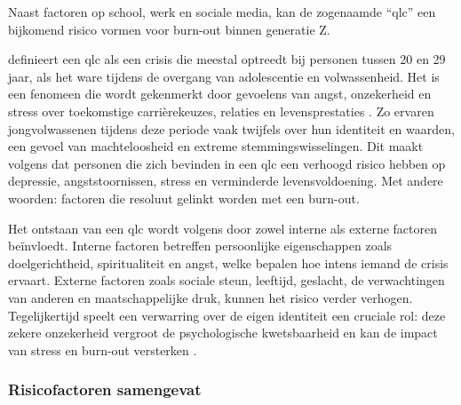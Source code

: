 Naast factoren op school, werk en sociale media, kan de zogenaamde “\acrlong{qlc}” een bijkomend risico vormen voor burn-out binnen generatie Z.

\vspace{1em}

\textcite{Hasyim2024} definieert een \acrshort{qlc} als een crisis die meestal optreedt bij personen tussen 20 en 29 jaar, als het ware tijdens de overgang van adolescentie en volwassenheid. Het is een fenomeen die wordt gekenmerkt door gevoelens van angst, onzekerheid en stress over toekomstige carrièrekeuzes, relaties en levensprestaties \autocite{Hasyim2024}. Zo ervaren jongvolwassenen tijdens deze periode vaak twijfels over hun identiteit en waarden, een gevoel van machteloosheid en extreme stemmingswisselingen. Dit maakt volgens \textcite{Hasyim2024} dat personen die zich bevinden in een \acrshort{qlc} een verhoogd risico hebben op depressie, angststoornissen, stress en verminderde levensvoldoening. Met andere woorden: factoren die resoluut gelinkt worden met een burn-out.

\vspace{1em}

Het ontstaan van een \acrlong{qlc} wordt volgens \textcite{Hasyim2024} door zowel interne als externe factoren beïnvloedt. Interne factoren betreffen persoonlijke eigenschappen zoals doelgerichtheid, spiritualiteit en angst, welke bepalen hoe intens iemand de crisis ervaart. Externe factoren zoals sociale steun, leeftijd, geslacht, de verwachtingen van anderen en maatschappelijke druk, kunnen het risico verder verhogen. Tegelijkertijd speelt een verwarring over de eigen identiteit een cruciale rol: deze zekere onzekerheid vergroot de psychologische kwetsbaarheid en kan de impact van stress en burn-out versterken \autocite{Hasyim2024}.

\newpage

\subsubsection{Risicofactoren samengevat}
\label{subsubsec:risicofactoren-samengevat}

